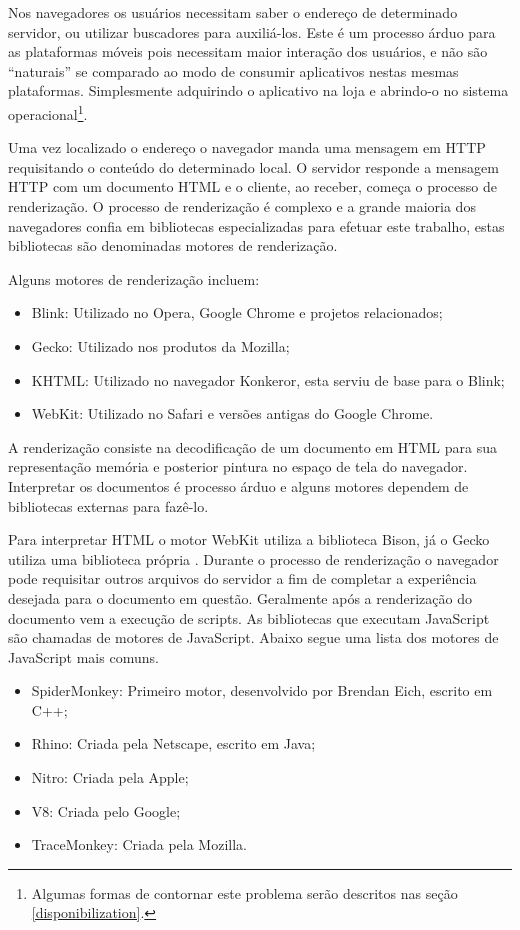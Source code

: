Nos navegadores os usuários necessitam saber o endereço de determinado
servidor, ou utilizar buscadores para auxiliá-los. Este é um processo
árduo para as plataformas móveis pois necessitam maior interação
dos usuários, e não são “naturais” se comparado ao modo de
consumir aplicativos nestas mesmas plataformas. Simplesmente adquirindo
o aplicativo na loja e abrindo-o no sistema operacional\footnote{Algumas
formas de contornar este problema serão descritos nas seção
\ref{disponibilization}.}.

Uma vez localizado o endereço o navegador manda uma mensagem em HTTP
requisitando o conteúdo do determinado local. O servidor responde a
mensagem HTTP com um documento HTML e o cliente, ao receber, começa o
processo de renderização. O processo de renderização é complexo e a
grande maioria dos navegadores confia em bibliotecas especializadas para
efetuar este trabalho, estas bibliotecas são denominadas motores de renderização.

Alguns motores de renderização incluem:

\begin{itemize}
    \item Blink: Utilizado no Opera, Google Chrome e projetos relacionados;
    \item Gecko: Utilizado nos produtos da Mozilla;
    \item KHTML: Utilizado no navegador Konkeror, esta serviu de base para o Blink;
    \item WebKit: Utilizado no Safari e versões antigas do Google Chrome.
\end{itemize}

A renderização consiste na decodificação de um documento em HTML
para sua representação memória e posterior pintura no espaço de tela
do navegador. Interpretar os documentos é processo árduo e alguns
motores dependem de bibliotecas externas para fazê-lo. 

Para interpretar HTML o motor WebKit utiliza a biblioteca Bison, já
o Gecko utiliza uma biblioteca própria \autocite{howBrowsersWork}.
Durante o processo de renderização o navegador pode requisitar outros
arquivos do servidor a fim de completar a experiência desejada para o
documento em questão. Geralmente após a renderização do documento
vem a execução de scripts. As bibliotecas que executam JavaScript são
chamadas de motores de JavaScript. Abaixo segue uma lista dos motores de
JavaScript mais comuns.

\begin{itemize}
    \item SpiderMonkey: Primeiro motor, desenvolvido por Brendan Eich, escrito em C++;
    \item Rhino: Criada pela Netscape, escrito em Java;
    \item Nitro: Criada pela Apple;
    \item V8: Criada pelo Google;
    \item TraceMonkey: Criada pela Mozilla.
\end{itemize}

